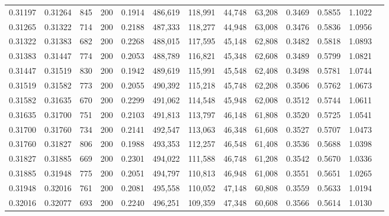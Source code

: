 \begin{tabular}{rrrrrrrrrrrrr}
0.31197 & 0.31264 &    845 & 200 &                                     0.1914 & 486,619 & 118,991 &  44,748 &  63,208 & 0.3469 & 0.5855 & 1.1022 \\
0.31265 & 0.31322 &    714 & 200 &                                     0.2188 & 487,333 & 118,277 &  44,948 &  63,008 & 0.3476 & 0.5836 & 1.0956 \\
0.31322 & 0.31383 &    682 & 200 &                                     0.2268 & 488,015 & 117,595 &  45,148 &  62,808 & 0.3482 & 0.5818 & 1.0893 \\
0.31383 & 0.31447 &    774 & 200 &                                     0.2053 & 488,789 & 116,821 &  45,348 &  62,608 & 0.3489 & 0.5799 & 1.0821 \\
0.31447 & 0.31519 &    830 & 200 &                                     0.1942 & 489,619 & 115,991 &  45,548 &  62,408 & 0.3498 & 0.5781 & 1.0744 \\
0.31519 & 0.31582 &    773 & 200 &                                     0.2055 & 490,392 & 115,218 &  45,748 &  62,208 & 0.3506 & 0.5762 & 1.0673 \\
0.31582 & 0.31635 &    670 & 200 &                                     0.2299 & 491,062 & 114,548 &  45,948 &  62,008 & 0.3512 & 0.5744 & 1.0611 \\
0.31635 & 0.31700 &    751 & 200 &                                     0.2103 & 491,813 & 113,797 &  46,148 &  61,808 & 0.3520 & 0.5725 & 1.0541 \\
0.31700 & 0.31760 &    734 & 200 &                                     0.2141 & 492,547 & 113,063 &  46,348 &  61,608 & 0.3527 & 0.5707 & 1.0473 \\
0.31760 & 0.31827 &    806 & 200 &                                     0.1988 & 493,353 & 112,257 &  46,548 &  61,408 & 0.3536 & 0.5688 & 1.0398 \\
0.31827 & 0.31885 &    669 & 200 &                                     0.2301 & 494,022 & 111,588 &  46,748 &  61,208 & 0.3542 & 0.5670 & 1.0336 \\
0.31885 & 0.31948 &    775 & 200 &                                     0.2051 & 494,797 & 110,813 &  46,948 &  61,008 & 0.3551 & 0.5651 & 1.0265 \\
0.31948 & 0.32016 &    761 & 200 &                                     0.2081 & 495,558 & 110,052 &  47,148 &  60,808 & 0.3559 & 0.5633 & 1.0194 \\
0.32016 & 0.32077 &    693 & 200 &                                     0.2240 & 496,251 & 109,359 &  47,348 &  60,608 & 0.3566 & 0.5614 & 1.0130 \\

\end{tabular}
